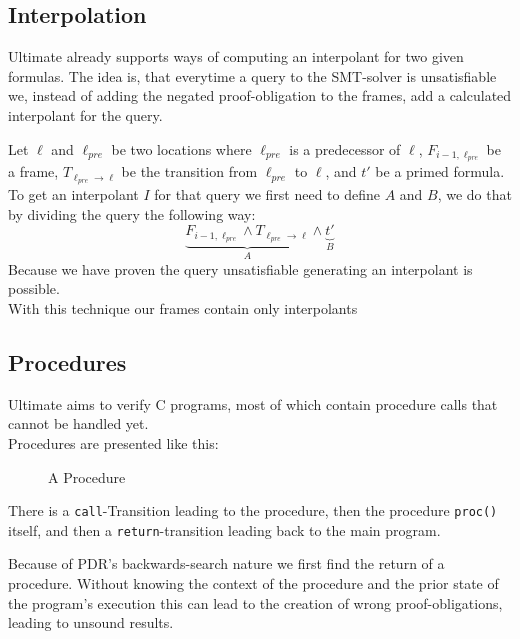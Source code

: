 \documentclass[11pt, a4paper, BCOR=10mm, ngerman, oneside]{scrbook}
\begin{document}
\subsection{Interpolation}
Ultimate already supports ways of computing an interpolant for two given formulas. The idea is, that everytime a query to the SMT-solver is unsatisfiable we, instead of adding the negated proof-obligation to the frames, add a calculated interpolant for the query. \par
Let $\ell$ and $\ell_{pre}$ be two locations where $\ell_{pre}$ is a predecessor of $\ell$, $F_{i - 1, \ell_{pre}}$ be a frame, $T_{\ell_{pre} \rightarrow \ell}$ be the transition from $\ell_{pre}$ to $\ell$, and $t'$ be a primed formula. \\
To get an interpolant $I$ for that query we first need to define $A$ and $B$, we do that by dividing the query the following way:
\begin{equation*}
\underbrace{F_{i - 1, \ell_{pre}} \land T_{\ell_{pre} \rightarrow \ell}}_{A} \land \underbrace{t'}_B
\end{equation*}
Because we have proven the query unsatisfiable generating an interpolant is possible. \\
With this technique our frames contain only interpolants
\subsection{Procedures}
Ultimate aims to verify C programs, most of which contain procedure calls that cannot be handled yet. \\ Procedures are presented like this: 

\begin{figure}[H]
\centering
{}
  \caption{A Procedure}
 \end{figure}
 \label{ex1}  

There is a \texttt{call}-Transition leading to the procedure, then the procedure \texttt{proc()} itself, and then a \texttt{return}-transition leading back to the main program. \par
Because of PDR's backwards-search nature we first find the return of a procedure. Without knowing the context of the procedure and the prior state of the program's execution this can lead to the creation of wrong proof-obligations, leading to unsound results. \par
\end{document}
